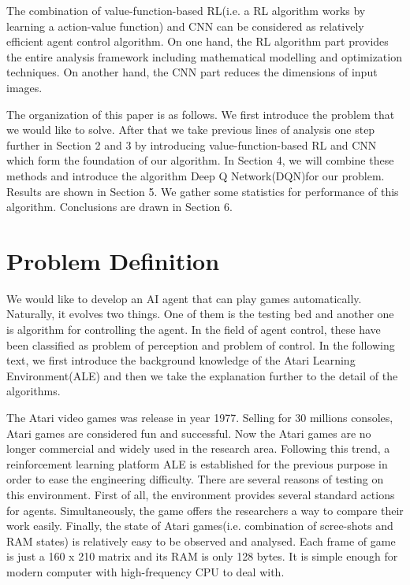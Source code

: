 \documentclass{article}
\begin{document}
The combination of value-function-based RL(i.e. a RL algorithm works by learning a action-value function\cite{barto1998reinforcement}) and CNN can be considered as relatively efficient agent control algorithm. On one hand, the RL algorithm part provides the entire analysis framework including mathematical modelling and optimization techniques. On another hand, the CNN part reduces the dimensions of input images. 

The organization of this paper is as follows. We first introduce the problem that we would like to solve. After that we take previous lines of analysis one step further in Section 2 and 3 by introducing value-function-based RL and CNN which form the foundation of our algorithm. In Section 4, we will combine these methods and introduce the algorithm Deep Q Network(DQN)for our problem. Results are shown in Section 5. We gather some statistics for performance of this algorithm. Conclusions are drawn in Section 6. 

\section{Problem Definition}
We would like to develop an AI agent that can play games automatically. Naturally, it evolves two things. One of them is the testing bed and another one is algorithm for controlling the agent. In the field of agent control, these have been classified as problem of perception and problem of control. In the following text, we first introduce the background knowledge of the Atari Learning Environment(ALE) and then we take the explanation further to the detail of the algorithms.

The Atari video games was release in year 1977. Selling for 30 millions consoles, Atari games are considered fun and successful. Now the Atari games are no longer commercial and widely used in the research area. Following this trend, a reinforcement learning platform ALE is established for the previous purpose in order to ease the engineering difficulty\cite{bellemare12arcade}. There are several reasons of testing on this environment. First of all, the environment provides several standard actions for agents. Simultaneously, the game offers the researchers a way to compare their work easily. Finally, the state of Atari games(i.e. combination of scree-shots and RAM states) is relatively easy to be observed and analysed. Each frame of game is just a 160 x 210 matrix and its RAM is only 128 bytes. It is simple enough for modern computer with high-frequency CPU to deal with.
\end{document}
